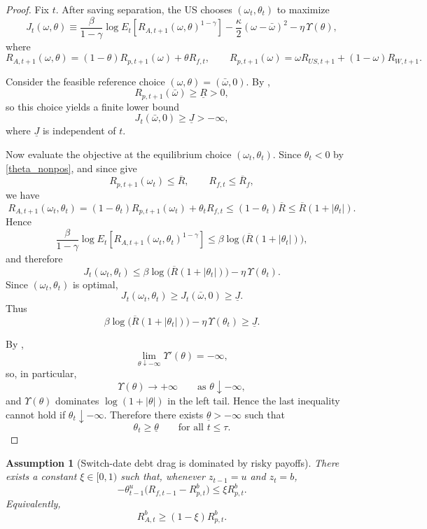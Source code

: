 \documentclass[12pt]{article}
\theoremstyle{plain}
\newtheorem{ass}{Assumption}
\begin{document}
\begin{proof}
Fix $t$. After saving separation, the US chooses $(\omega_t,\theta_t)$ to maximize
\[
J_t(\omega,\theta)
\equiv
\frac{\beta}{1-\gamma}\log E_t\!\left[R_{A,t+1}(\omega,\theta)^{1-\gamma}\right]
-\frac{\kappa}{2}(\omega-\bar\omega)^2
-\eta\,\Upsilon(\theta),
\]
where
\[
R_{A,t+1}(\omega,\theta)
=
(1-\theta)R_{p,t+1}(\omega)+\theta R_{f,t},
\qquad
R_{p,t+1}(\omega)=\omega R_{US,t+1}+(1-\omega)R_{W,t+1}.
\]

Consider the feasible reference choice $(\omega,\theta)=(\bar\omega,0)$. By ,
\[
R_{p,t+1}(\bar\omega) \ge \underline R >0,
\]
so this choice yields a finite lower bound
\[
J_t(\bar\omega,0)\ge \underline J>-\infty,
\]
where $\underline J$ is independent of $t$.

Now evaluate the objective at the equilibrium choice $(\omega_t,\theta_t)$. Since $\theta_t<0$ by
\eqref{theta_nonpos}, and since  give
\[
R_{p,t+1}(\omega_t)\le \overline R,
\qquad
R_{f,t}\le \overline R_f,
\]
we have
\[
R_{A,t+1}(\omega_t,\theta_t)
=
(1-\theta_t)R_{p,t+1}(\omega_t)+\theta_t R_{f,t}
\le
(1-\theta_t)\overline R
\le
\overline R(1+|\theta_t|).
\]
Hence
\[
\frac{\beta}{1-\gamma}\log E_t\!\left[R_{A,t+1}(\omega_t,\theta_t)^{1-\gamma}\right]
\le
\beta\log\!\bigl(\overline R(1+|\theta_t|)\bigr),
\]
and therefore
\[
J_t(\omega_t,\theta_t)
\le
\beta\log\!\bigl(\overline R(1+|\theta_t|)\bigr)-\eta\,\Upsilon(\theta_t).
\]
Since $(\omega_t,\theta_t)$ is optimal,
\[
J_t(\omega_t,\theta_t)\ge J_t(\bar\omega,0)\ge \underline J.
\]
Thus
\[
\beta\log\!\bigl(\overline R(1+|\theta_t|)\bigr)-\eta\,\Upsilon(\theta_t)\ge \underline J.
\]

By ,
\[
\lim_{\theta\downarrow -\infty}\Upsilon'(\theta)=-\infty,
\]
so, in particular,
\[
\Upsilon(\theta)\to+\infty
\qquad\text{as }\theta\downarrow -\infty,
\]
and $\Upsilon(\theta)$ dominates $\log(1+|\theta|)$ in the left tail. Hence the last inequality cannot hold if
$\theta_t\downarrow -\infty$. Therefore there exists $\underline\theta>-\infty$ such that
\[
\theta_t\ge \underline\theta
\qquad\text{for all }t\le\tau.
\]
\end{proof}


\begin{ass}[Switch-date debt drag is dominated by risky payoffs]\label{ass_switch_debt_drag}
There exists a constant $\xi\in[0,1)$ such that, whenever $z_{t-1}=u$ and $z_t=b$,
\[
-\theta_{t-1}^u\bigl(R_{f,t-1}-R_{p,t}^b\bigr)\le \xi R_{p,t}^b.
\]
Equivalently,
\[
R_{A,t}^b\ge (1-\xi)R_{p,t}^b.
\]
\end{ass}
\end{document}
